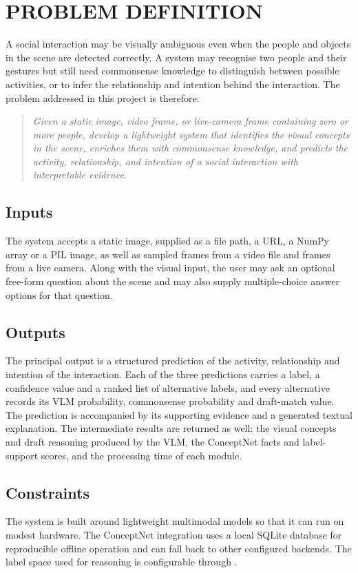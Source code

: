 \section{PROBLEM DEFINITION}

A social interaction may be visually ambiguous even when the people and objects in the scene are detected correctly. A system may recognise two people and their gestures but still need commonsense knowledge to distinguish between possible activities, or to infer the relationship and intention behind the interaction. The problem addressed in this project is therefore:

\begin{quote}
\itshape Given a static image, video frame, or live-camera frame containing zero or more people, develop a lightweight system that identifies the visual concepts in the scene, enriches them with commonsense knowledge, and predicts the activity, relationship, and intention of a social interaction with interpretable evidence.
\end{quote}

\subsection{Inputs}
The system accepts a static image, supplied as a file path, a URL, a NumPy array or a PIL image, as well as sampled frames from a video file and frames from a live camera. Along with the visual input, the user may ask an optional free-form question about the scene and may also supply multiple-choice answer options for that question.

\subsection{Outputs}
The principal output is a structured prediction of the activity, relationship and intention of the interaction. Each of the three predictions carries a label, a confidence value and a ranked list of alternative labels, and every alternative records its VLM probability, commonsense probability and draft-match value. The prediction is accompanied by its supporting evidence and a generated textual explanation. The intermediate results are returned as well: the visual concepts and draft reasoning produced by the VLM, the ConceptNet facts and label-support scores, and the processing time of each module.

\subsection{Constraints}
The system is built around lightweight multimodal models so that it can run on modest hardware. The ConceptNet integration uses a local SQLite database for reproducible offline operation and can fall back to other configured backends. The label space used for reasoning is configurable through .

